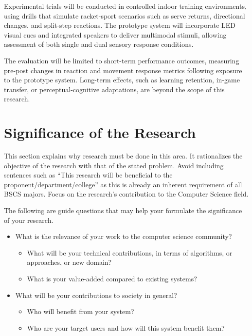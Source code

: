 Experimental trials will be conducted in controlled indoor training environments, using drills that simulate racket-sport scenarios such as serve returns, directional changes, and split-step reactions. The prototype system will incorporate LED visual cues and integrated speakers to deliver multimodal stimuli, allowing assessment of both single and dual sensory response conditions.

The evaluation will be limited to short-term performance outcomes, measuring pre-post changes in reaction and movement response metrics following exposure to the prototype system. Long-term effects, such as learning retention, in-game transfer, or perceptual-cognitive adaptations, are beyond the scope of this research.


\section{Significance of the Research}
\label{sec:significance}

This section explains why research must be done in this area.
 It rationalizes the objective of the research with that of the stated problem. 
 Avoid including sentences such as ``This research will be beneficial to the proponent/department/college'' as this is already an inherent requirement of all BSCS majors.  Focus on the research's contribution to the Computer Science field.

The following are guide questions that may help your formulate the significance of your research. 


%
%
\begin{itemize}
\item  What is the relevance of your work to the computer science community? 

\begin{itemize} 
\item What will be your technical contributions, in terms of algorithms, or approaches, or new domain? 
\item What is your value-added compared to existing systems? 
\end{itemize}

\item What will be your contributions to society in general? 
    \begin{itemize}
      \item Who will benefit from your system? 
      \item Who are your target users and how will this system benefit them? 
   \end{itemize}
\end{itemize}

\begin{comment}
If applicable, describe possible commercialization and/or innovation in your research.
\end{comment}


